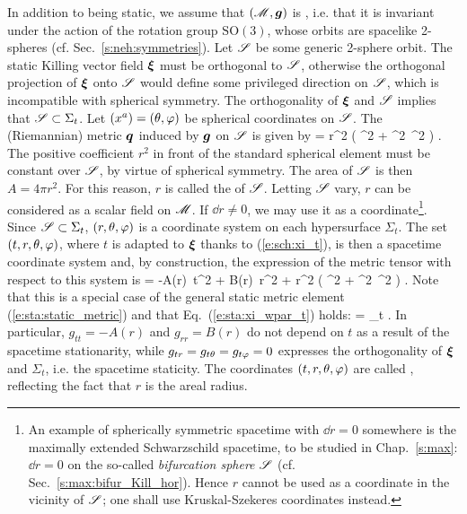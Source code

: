 In addition to being static, we assume that $(\mathscr{M},\bm{g})$ is ,
i.e. that it is invariant under the action of the rotation group $\mathrm{SO}(3)$,
whose orbits are spacelike 2-spheres (cf. Sec.~\ref{s:neh:symmetries}).
Let $\mathscr{S}$ be some generic 2-sphere orbit. The static Killing vector field $\bm{\xi}$
must be orthogonal to $\mathscr{S}$, otherwise the orthogonal projection of $\bm{\xi}$
onto $\mathscr{S}$ would define some privileged direction on $\mathscr{S}$, which is incompatible
with spherical symmetry. The orthogonality of $\bm{\xi}$ and $\mathscr{S}$ implies
that $\mathscr{S}\subset\Sigma_t$. Let $(x^a)=(\theta,\varphi)$ be spherical coordinates on
$\mathscr{S}$. The (Riemannian) metric $\bm{q}$ induced by $\bm{g}$ on $\mathscr{S}$ is given by
\be
     = r^2 \left( \dd\th^2 + \sin^2\th\, \dd\ph^2 \right) .
\ee
The positive coefficient $r^2$ in front of the standard spherical element must be
constant over $\mathscr{S}$, by virtue of spherical symmetry. The area of $\mathscr{S}$ is
then $A=4\pi r^2$. For this reason, $r$ is called the 
of $\mathscr{S}$. Letting $\mathscr{S}$ vary, $r$ can be considered as a scalar field on
$\mathscr{M}$. If $\dd r \not = 0$, we may use it as a coordinate\footnote{An example of spherically symmetric spacetime with $\dd r = 0$ somewhere is the maximally extended Schwarzschild spacetime,
to be studied in Chap.~\ref{s:max}: $\dd r = 0$ on the so-called
\emph{bifurcation sphere} $\mathscr{S}$ (cf. Sec.~\ref{s:max:bifur_Kill_hor}). Hence $r$ cannot be used
as a coordinate in the vicinity of $\mathscr{S}$; one shall use Kruskal-Szekeres coordinates instead.}. Since $\mathscr{S}\subset \Sigma_t$,
$(r,\theta,\varphi)$ is a coordinate system on each hypersurface $\Sigma_t$.
The set $(t,r,\theta,\varphi)$,
where $t$ is adapted to $\bm{\xi}$ thanks to (\ref{e:sch:xi_t}), is then a
spacetime coordinate system and, by construction, the expression of the metric tensor
with respect to this system is
\be \label{e:sch:g_AB}
     = -A(r)\, \dd t^2 + B(r)\, \dd r^2 +
        r^2 \left( \dd\th^2 + \sin^2\th\, \dd\ph^2 \right) .
\ee
Note that this is a special case of the general static metric element
(\ref{e:sta:static_metric}) and that Eq.~(\ref{e:sta:xi_wpar_t}) holds:
\be \label{e:sch:xi_wpar_t}
    \w{\xi} = \wpar_t .
\ee
In particular, $g_{tt} = -A(r)$ and $g_{rr} = B(r)$ do not depend on $t$
as a result of the spacetime stationarity, while
$g_{tr} = g_{t\theta} = g_{t\varphi} = 0$ expresses the orthogonality of $\bm{\xi}$
and $\Sigma_t$, i.e. the spacetime staticity.
The coordinates $(t,r,\theta,\varphi)$ are called ,
reflecting the fact that $r$ is the areal radius.

